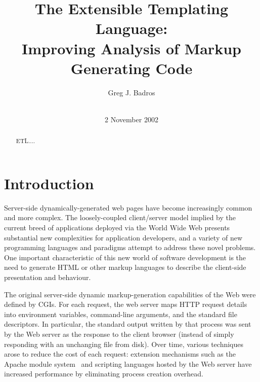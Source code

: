 \documentclass{www2003-submission}
\newcommand{\B}{\discretionary{}{}{}}
\begin{document}
%
\title{The Extensible Templating Language: \\
       Improving Analysis of Markup Generating Code}


\author{
%
\alignauthor Greg J. Badros\\
       \\
}
\date{2 November 2002}
\maketitle
\begin{abstract}
ETL....
\end{abstract}




\section{Introduction}

Server-side dynamically-generated web pages have become increasingly
common and more complex.  The loosely-coupled client/\B{}server model
implied by the current breed of applications deployed via the World
Wide Web presents substantial new complexities for application
developers, and a variety of new programming languages and paradigms
attempt to address these novel problems.  One important characteristic
of this new world of software development is the need to generate HTML
or other markup languages to describe the client-side presentation and
behaviour.

The original server-side dynamic markup-generation capabilities of the
Web were defined by CGIs.\cite{CGI} For each request, the web server
maps HTTP request details into environment variables, command-line
arguments, and the standard file descriptors.  In particular, the
standard output written by that process was sent by the Web server as
the response to the client browser (instead of simply responding with
an unchanging file from disk).  Over time, various techniques arose to
reduce the cost of each request: extension mechanisms such as the
Apache module system~\cite{ApacheModules} and scripting languages
hosted by the Web server have increased performance by eliminating
process creation overhead.
\end{document}
